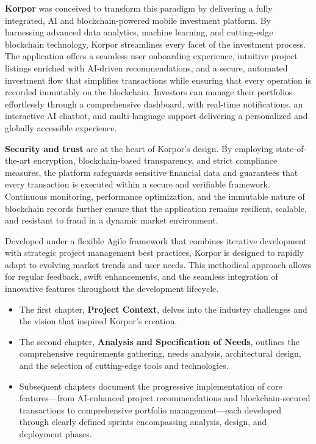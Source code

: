 \noindent \textbf{\textcolor{primary}{Korpor}} was conceived to transform this paradigm by delivering a fully integrated, AI and blockchain-powered mobile investment platform. By harnessing advanced data analytics, machine learning, and cutting-edge blockchain technology, Korpor streamlines every facet of the investment process. The application offers a seamless user onboarding experience, intuitive project listings enriched with AI-driven recommendations, and a secure, automated investment flow that simplifies transactions while ensuring that every operation is recorded immutably on the blockchain. Investors can manage their portfolios effortlessly through a comprehensive dashboard, with real-time notifications, an interactive AI chatbot, and multi-language support delivering a personalized and globally accessible experience.

\noindent \textbf{\textcolor{primary}{Security and trust}} are at the heart of Korpor's design. By employing state-of-the-art encryption, blockchain-based transparency, and strict compliance measures, the platform safeguards sensitive financial data and guarantees that every transaction is executed within a secure and verifiable framework. Continuous monitoring, performance optimization, and the immutable nature of blockchain records further ensure that the application remains resilient, scalable, and resistant to fraud in a dynamic market environment.

\noindent Developed under a flexible Agile framework that combines iterative development with strategic project management best practices, Korpor is designed to rapidly adapt to evolving market trends and user needs. This methodical approach allows for regular feedback, swift enhancements, and the seamless integration of innovative features throughout the development lifecycle.



\begin{itemize}[leftmargin=1.5em, itemsep=0pt, parsep=0pt, topsep=0.05cm]
\item The first chapter, \textbf{\textcolor{primary}{Project Context}}, delves into the industry challenges and the vision that inspired Korpor's creation.
\item The second chapter, \textbf{\textcolor{primary}{Analysis and Specification of Needs}}, outlines the comprehensive requirements gathering, needs analysis, architectural design, and the selection of cutting-edge tools and technologies.
\item Subsequent chapters document the progressive implementation of core features—from AI-enhanced project recommendations and blockchain-secured transactions to comprehensive portfolio management—each developed through clearly defined sprints encompassing analysis, design, and deployment phases.
\end{itemize}

